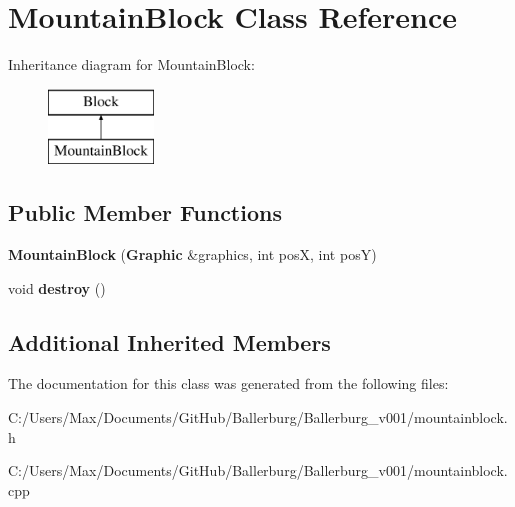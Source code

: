 \section{Mountain\+Block Class Reference}
\label{class_mountain_block}
Inheritance diagram for Mountain\+Block\+:\begin{figure}[H]
\begin{center}
\leavevmode
\includegraphics[height=2.000000cm]{class_mountain_block}
\end{center}
\end{figure}
\subsection*{Public Member Functions}
\begin{DoxyCompactItemize}
\item 
{\bfseries Mountain\+Block} ({\bf Graphic} \&graphics, int pos\+X, int pos\+Y)\label{class_mountain_block_a0a4ab12f0943bf6b767f1ead39b6a895}

\item 
void {\bfseries destroy} ()\label{class_mountain_block_ae556e11d2339dc3b586f70b739d0281d}

\end{DoxyCompactItemize}
\subsection*{Additional Inherited Members}


The documentation for this class was generated from the following files\+:\begin{DoxyCompactItemize}
\item 
C\+:/\+Users/\+Max/\+Documents/\+Git\+Hub/\+Ballerburg/\+Ballerburg\+\_\+v001/mountainblock.\+h\item 
C\+:/\+Users/\+Max/\+Documents/\+Git\+Hub/\+Ballerburg/\+Ballerburg\+\_\+v001/mountainblock.\+cpp\end{DoxyCompactItemize}
